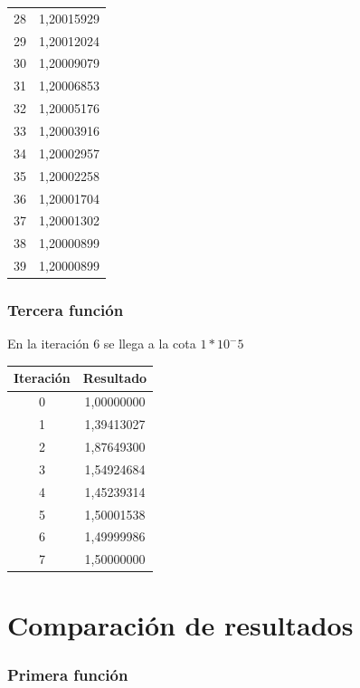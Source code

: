 \documentclass[titlepage,a4paper]{article}
\begin{document}
\begin{multicols}{2}
\begin{center}
\begin{tabular}{| c | c |}
        28    & 1,20015929 \\
        29    & 1,20012024 \\
        30    & 1,20009079 \\
        31    & 1,20006853 \\
        32    & 1,20005176 \\
        33    & 1,20003916 \\
        34    & 1,20002957 \\
        35    & 1,20002258 \\
        36    & 1,20001704 \\
        37    & 1,20001302 \\
        38    & 1,20000899 \\
        39    & 1,20000899 \\
    \hline
    \end{tabular}
\end{center}
\end{multicols}

\subsubsection{Tercera función}\label{sec:sec3}
En la iteración 6 se llega a la cota $1*10^-5$
\begin{center}
\begin{tabular}{| c | c |}
    \hline
     Iteración & Resultado \\ \hline
        0     & 1,00000000 \\
        1     & 1,39413027 \\
        2     & 1,87649300 \\
        3     & 1,54924684 \\
        4     & 1,45239314 \\
        5     & 1,50001538 \\
        6     & 1,49999986 \\
        7     & 1,50000000 \\
    \hline
    \end{tabular}
\end{center}

\section{Comparación de resultados}\label{sec:comparacion_resultados}
\subsubsection{Primera función}\label{sec:CR1}
\end{document}
